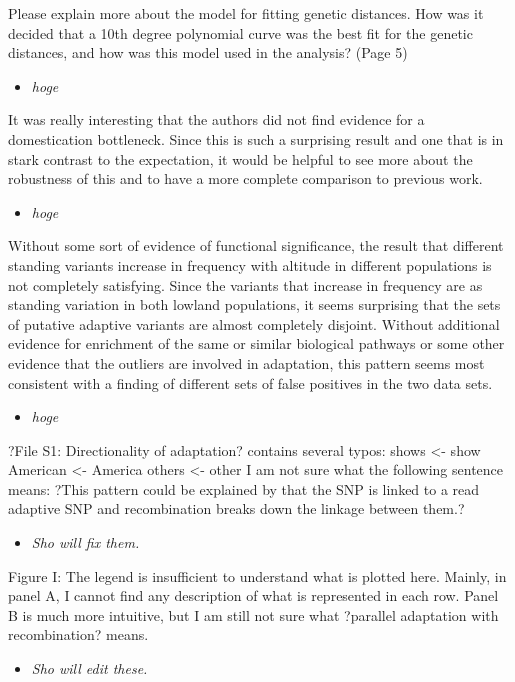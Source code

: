 \documentclass[onecolumn,oneside,letterpaper]{article}
\begin{document}
Please explain more about the model for fitting genetic distances.  How was it decided that a 10th degree polynomial curve was the best fit for the genetic distances, and how was this model used in the analysis? (Page 5)  
\setlength{\parskip}{-5.0pt}
\begin{itemize}
\item \textit{ hoge }
\end{itemize}
\setlength{\parskip}{10.0pt}

It was really interesting that the authors did not find evidence for a domestication bottleneck.  Since this is such a surprising result and one that is in stark contrast to the expectation, it would be helpful to see more about the robustness of this and to have a more complete comparison to previous work.  
\setlength{\parskip}{-5.0pt}
\begin{itemize}
\item \textit{ hoge }
\end{itemize}
\setlength{\parskip}{10.0pt}

Without some sort of evidence of functional significance, the result that different standing variants increase in frequency with altitude in different populations is not completely satisfying.  Since the variants that increase in frequency are as standing variation in both lowland populations, it seems surprising that the sets of putative adaptive variants are almost completely disjoint.  Without additional evidence for enrichment of the same or similar biological pathways or some other evidence that the outliers are involved in adaptation, this pattern seems most consistent with a finding of different sets of false positives in the two data sets.  
\setlength{\parskip}{-5.0pt}
\begin{itemize}
\item \textit{ hoge }
\end{itemize}
\setlength{\parskip}{10.0pt}

?File S1: Directionality of adaptation? contains several typos: 
shows <- show 
American <- America 
others <- other 
I am not sure what the following sentence means: ?This pattern could be explained by that the SNP is linked to a read adaptive SNP and recombination breaks down the linkage between them.?   
\setlength{\parskip}{-5.0pt}
\begin{itemize}
\item \textit{ Sho will fix them. }
\end{itemize}
\setlength{\parskip}{10.0pt}

Figure I: The legend is insufficient to understand what is plotted here. Mainly, in panel A, I cannot find any description of what is represented in each row. Panel B is much more intuitive, but I am still not sure what ?parallel adaptation with recombination? means.  
\setlength{\parskip}{-5.0pt}
\begin{itemize}
\item \textit{ Sho will edit these. }
\end{itemize}
\setlength{\parskip}{10.0pt}

\end{document}

